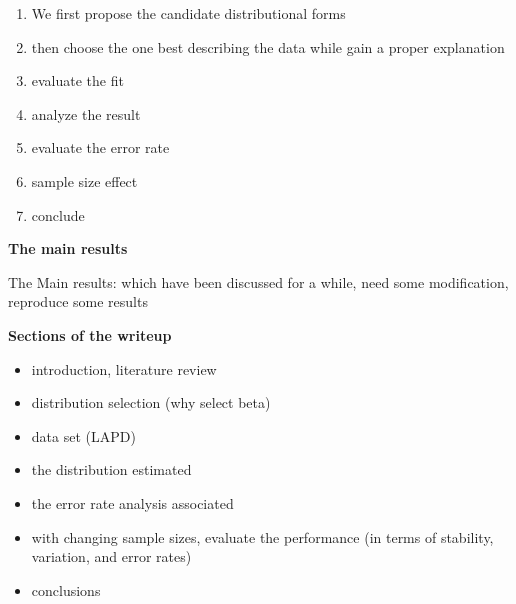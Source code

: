 \documentclass[12pt]{article}         %
\begin{document}
\begin{enumerate}
\item We first propose the candidate distributional forms
\item then choose the one best describing the data while gain a proper explanation
\item evaluate the fit
\item analyze the result
\item evaluate the error rate
\item sample size effect
\item conclude
\end{enumerate}

\textbf {The main results}

\bigskip

The Main results: which have been discussed for a while, need some modification, reproduce some results

\bigskip

\textbf {Sections of the writeup}

\begin{itemize}
  \item introduction, literature review
  \item distribution selection (why select beta)
  \item data set (LAPD)
  \item the distribution estimated
  \item the error rate analysis associated
  \item with changing sample sizes, evaluate the performance (in terms of stability, variation, and error rates)
  \item conclusions
\end{itemize}
\end{document}
